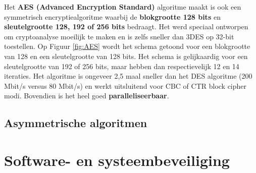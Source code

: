 \documentclass{report}
\begin{document}
	Het \textbf{AES (Advanced Encryption Standard)} algoritme maakt is ook een symmetrisch encryptiealgoritme waarbij de \textbf{blokgrootte 128 bits} en \textbf{sleutelgrootte 128, 192 of 256 bits} bedraagt. Het werd speciaal ontworpen om cryptoanalyse moeilijk te maken en is zelfs sneller dan 3DES op 32-bit toestellen. Op Figuur \ref{fig:AES} wordt het schema getoond voor een blokgrootte van 128 en een sleutelgrootte van 128 bits. Het schema is gelijkaardig voor een sleutelgrootte van 192 of 256 bits, maar hebben dan respectievelijk 12 en 14 iteraties. Het algoritme is ongeveer 2,5 maal sneller dan het DES algoritme (200 Mbit/s versus 80 Mbit/s) en werkt uitsluitend voor CBC of CTR block cipher modi. Bovendien is het heel goed \textbf{paralleliseerbaar}.

	\section{Asymmetrische algoritmen}
	
	
	\chapter{Software- en systeembeveiliging}
\end{document}
